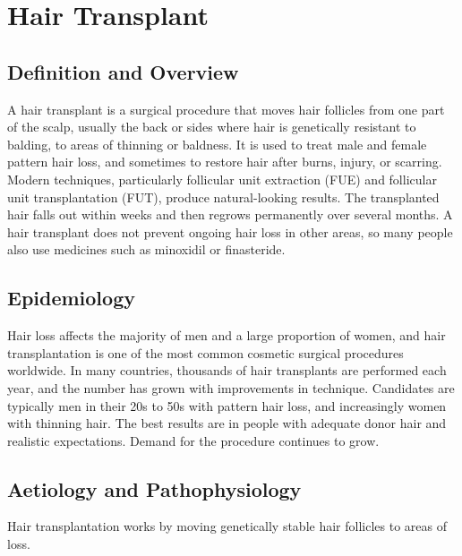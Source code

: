 \chapter{Hair Transplant}

\section*{Definition and Overview}
A hair transplant is a surgical procedure that moves hair follicles from one part of the scalp, usually the back or sides where hair is genetically resistant to balding, to areas of thinning or baldness. It is used to treat male and female pattern hair loss, and sometimes to restore hair after burns, injury, or scarring. Modern techniques, particularly follicular unit extraction (FUE) and follicular unit transplantation (FUT), produce natural-looking results. The transplanted hair falls out within weeks and then regrows permanently over several months. A hair transplant does not prevent ongoing hair loss in other areas, so many people also use medicines such as minoxidil or finasteride.

\section*{Epidemiology}
Hair loss affects the majority of men and a large proportion of women, and hair transplantation is one of the most common cosmetic surgical procedures worldwide. In many countries, thousands of hair transplants are performed each year, and the number has grown with improvements in technique. Candidates are typically men in their 20s to 50s with pattern hair loss, and increasingly women with thinning hair. The best results are in people with adequate donor hair and realistic expectations. Demand for the procedure continues to grow.

\section*{Aetiology and Pathophysiology}
Hair transplantation works by moving genetically stable hair follicles to areas of loss.

